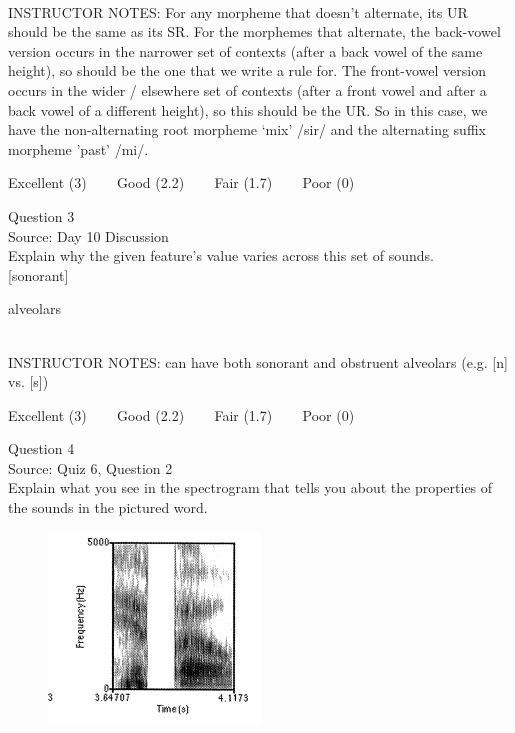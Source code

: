 \documentclass[12pt]{article}
\begin{document}
~\\
INSTRUCTOR NOTES: For any morpheme that doesn’t alternate, its UR should be the same as its SR.  For the morphemes that alternate, the back-vowel version occurs in the narrower set of contexts (after a back vowel of the same height), so should be the one that we write a rule for. The front-vowel version occurs in the wider / elsewhere set of contexts (after a front vowel and after a back vowel of a different height), so this should be the UR. So in this case, we have the non-alternating root morpheme ‘mix’ /sir/ and the alternating suffix morpheme 'past' /mi/.


\vfill
Excellent (3) ~~~ Good (2.2) ~~~ Fair (1.7) ~~~ Poor (0)
\newpage

{\large Question 3}\\

Source: Day 10 Discussion\\

Explain why the given feature's value varies across this set of sounds.\\

{[sonorant]}

alveolars


~\\
INSTRUCTOR NOTES: can have both sonorant and obstruent alveolars (e.g. [n] vs. [s])


\vfill
Excellent (3) ~~~ Good (2.2) ~~~ Fair (1.7) ~~~ Poor (0)
\newpage

{\large Question 4}\\

Source: Quiz 6, Question 2\\

Explain what you see in the spectrogram that tells you about the properties of the sounds in the pictured word.\\

\begin{figure}[H]
\includegraphics{../images/spectrogram_hippo.png}
\end{figure}
\end{document}

